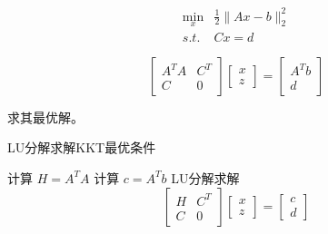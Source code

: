 \begin{problem}
    \begin{equation}\begin{aligned}
        \min _{x} & \frac{1}{2}\|A x-b\|_{2}^{2}\\
        s.t. & C x=d
    \end{aligned}\end{equation}

    \begin{equation}
\left[\begin{array}{cc}
A^{T} A & C^{T} \\
C & 0
\end{array}\right]\left[\begin{array}{l}
x \\
z
\end{array}\right]=\left[\begin{array}{c}
A^{T} b \\
d
\end{array}\right]
\end{equation}

求其最优解。
\end{problem}



\begin{algorithm}[htbp]
    \caption{LU分解求解KKT最优条件}
    计算 $ H=A^{T} A $\;
    计算 $ c=A^{T} b $ \;
    LU分解求解\begin{equation}
    \left[\begin{array}{cc}
    H & C^{T} \\
    C & 0
    \end{array}\right]\left[\begin{array}{l}
    x \\
    z
    \end{array}\right]=\left[\begin{array}{l}
    c \\
    d
    \end{array}\right]
    \end{equation}\;
\end{algorithm}

